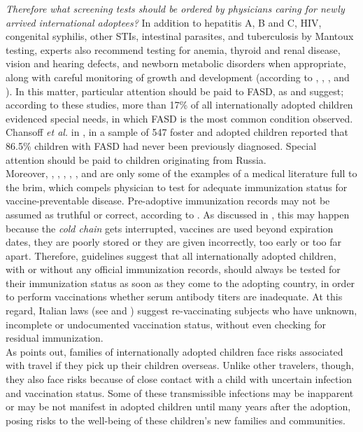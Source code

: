 \textit{Therefore what screening tests should be ordered by physicians caring for newly arrived international adoptees?} In addition to hepatitis A, B and C, HIV, congenital syphilis, other STIs, intestinal parasites, and tuberculosis by Mantoux testing, experts also recommend testing for anemia, thyroid and renal disease, vision and hearing defects, and newborn metabolic disorders when appropriate, along with careful monitoring of growth and development (according to \cite{caringfor}, \cite{medicalscreening}, \cite{notonlyinfectious}, and \cite{nonsoloinfezioni}). In this matter, particular attention should be paid to FASD, as \cite{notonlyinfectious} and \cite{nonsoloinfezioni} suggest; according to these studies, more than 17\% of all internationally adopted children evidenced special needs, in which FASD is the most common condition observed. Chansoff \textit{et al.} in \cite{misdiagnosis}, in a sample of 547 foster and adopted children reported that 86.5\% children with FASD had never been previously diagnosed. Special attention should be paid to children originating from Russia.\\
Moreover, \cite{caringfor}, \cite{medicalscreening}, \cite{initialeval}, \cite{immunizationstatus}, \cite{comphealtheval}, and \cite{immunizationstillinsufficient} are only some of the examples of a medical literature full to the brim, which compels physician to test for adequate immunization status for vaccine-preventable disease. Pre-adoptive immunization records may not be assumed as truthful or correct, according to \cite{immunizationstatus}. As discussed in \cite{comphealtheval}, this may happen because the \textit{cold chain} gets interrupted, vaccines are used beyond expiration dates, they are poorly stored or they are given incorrectly, too early or too far apart. Therefore, guidelines suggest that all internationally adopted children, with or without any official immunization records, should always be tested for their immunization status as soon as they come to the adopting country, in order to perform vaccinations whether serum antibody titers are inadequate. At this regard, Italian laws (see \cite{circolareministeriale} and \cite{centroprevenzione}) suggest re-vaccinating subjects who have unknown, incomplete or undocumented vaccination status, without even checking for residual immunization.\\
As \cite{preventing} points out, families of internationally adopted children face risks associated with travel if they pick up their children overseas. Unlike other travelers, though, they also face risks because of close contact with a child with uncertain infection and vaccination status. Some of these transmissible infections may be inapparent or may be not manifest in adopted children until many years after the adoption, posing risks to the well-being of these children's new families and communities.


